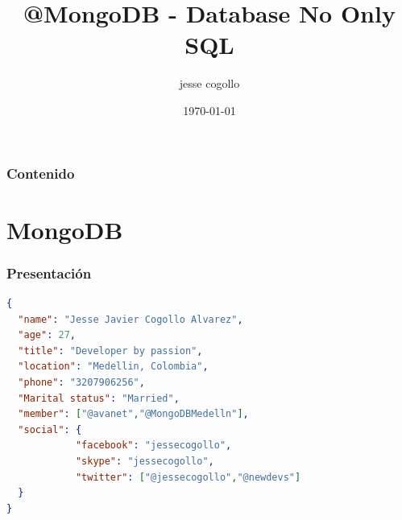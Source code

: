 \documentclass{beamer}
\title[@MongoDB]{@MongoDB - Database No Only SQL} %
\author{jesse cogollo} %
\institute[SENA] %
{
Developer by passion \\ %
\medskip
\textit{email: cogollo87@gmail.com} %
}
\date{\today} %
\begin{document}
\begin{frame}
\titlepage %
\end{frame}

\begin{frame}
\frametitle{Contenido} %
\tableofcontents %
\end{frame}


\section{MongoDB} %

\begin{frame}[fragile] %
\frametitle{Presentaci\'on}
\begin{example}[yo]

\begin{lstlisting}[language=json,firstnumber=1]
{
  "name": "Jesse Javier Cogollo Alvarez",
  "age": 27,
  "title": "Developer by passion",
  "location": "Medellin, Colombia",
  "phone": "3207906256",
  "Marital status": "Married",
  "member": ["@avanet","@MongoDBMedelln"],
  "social": {
    		"facebook": "jessecogollo", 
    		"skype": "jessecogollo", 
    		"twitter": ["@jessecogollo","@newdevs"]
  }
}
\end{lstlisting}

\end{example}
\end{frame}
\end{document}

